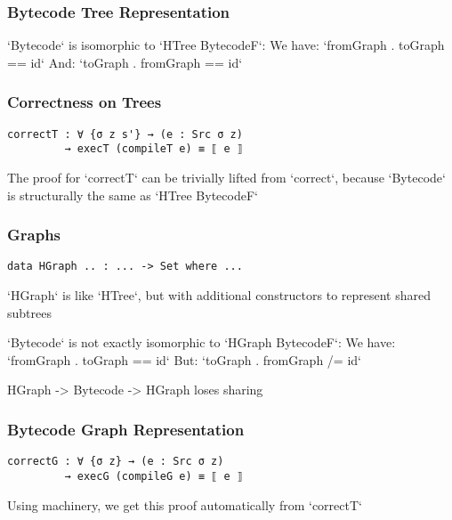         \begin{frame}[fragile]
            \frametitle{Bytecode Tree Representation}
            `Bytecode` is isomorphic to `HTree BytecodeF`:
            We have: `fromGraph . toGraph == id`
            And:     `toGraph . fromGraph == id`
        \end{frame}
                
        \begin{frame}[fragile]
            \frametitle{Correctness on Trees}
            \begin{verbatim}
correctT : ∀ {σ z s'} → (e : Src σ z) 
         → execT (compileT e) ≡ ⟦ e ⟧
            \end{verbatim}
            The proof for `correctT` can be trivially lifted from `correct`,
            because `Bytecode` is structurally the same as `HTree BytecodeF`
        \end{frame}

        \begin{frame}[fragile]
            \frametitle{Graphs}
            \begin{verbatim}
data HGraph .. : ... -> Set where ...
            \end{verbatim}
            
            `HGraph` is like `HTree`, but with additional constructors to represent shared subtrees
            
            `Bytecode` is not exactly isomorphic to `HGraph BytecodeF`:
            We have: `fromGraph . toGraph == id`
            But:     `toGraph . fromGraph /= id`
            
            HGraph -> Bytecode -> HGraph loses sharing
        \end{frame}
         
         \begin{frame}[fragile]
            \frametitle{Bytecode Graph Representation}
            \begin{verbatim}
correctG : ∀ {σ z} → (e : Src σ z) 
         → execG (compileG e) ≡ ⟦ e ⟧
            \end{verbatim}
            
            Using machinery, we get this proof automatically from `correctT`
        \end{frame}

